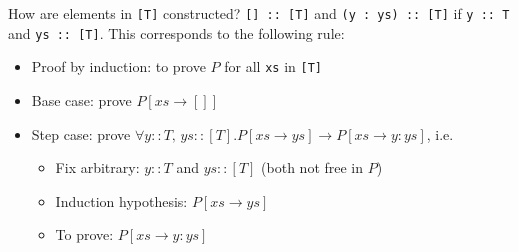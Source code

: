 \documentclass[a4paper]{extarticle}
\begin{document}
How are elements in \verb|[T]| constructed? \verb|[] :: [T]| and \verb|(y : ys) :: [T]| if \verb|y :: T| and \verb|ys :: [T]|. This corresponds to the following rule:

\begin{itemize}
    \item Proof by induction: to prove \(P\) for all \verb|xs| in \verb|[T]|
    \item Base case: prove \(P[xs \to []]\)
    \item Step case: prove \(\forall y :: T, \, ys :: [T].P[xs \to ys] \to P[xs \to y : ys]\), i.e.
    \begin{itemize}
        \item Fix arbitrary: \(y :: T\) and \(ys :: [T]\) (both not free in \(P\))
        \item Induction hypothesis: \(P[xs \to ys]\)
        \item To prove: \(P[xs \to y : ys]\)
    \end{itemize}
\end{itemize}
\end{document}
